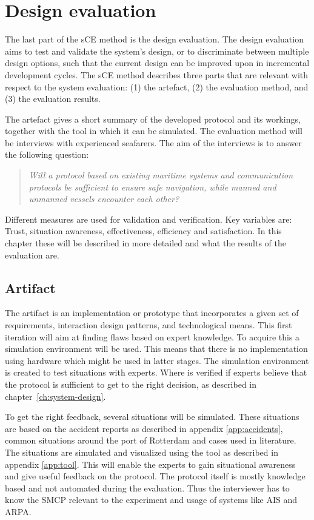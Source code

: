 \chapter{Design evaluation}
The last part of the sCE method is the design evaluation. The design evaluation aims to test and validate the system’s design, or to discriminate between multiple design options, such that the current design can be improved upon in incremental development cycles. The sCE method describes three parts that are relevant with respect to the system evaluation: (1) the artefact, (2) the evaluation method, and (3) the evaluation results.

The artefact gives a short summary of the developed protocol and its workings, together with the tool in which it can be simulated. The evaluation method will be interviews with experienced seafarers. The aim of the interviews is to answer the following question:
\begin{quotation}
	\emph{Will a protocol based on existing maritime systems and communication protocols be sufficient to ensure safe navigation, while manned and unmanned vessels encounter each other?}
\end{quotation}
Different measures are used for validation and verification. Key variables are: Trust, situation awareness, effectiveness, efficiency and satisfaction. In this chapter these will be described in more detailed and what the results of the evaluation are.

\section{Artifact}
The artifact is an implementation or prototype that incorporates a given set of requirements, interaction design patterns, and technological means. This first iteration will aim at finding flaws based on expert knowledge. To acquire this a simulation environment will be used. This means that there is no implementation using hardware which might be used in latter stages. The simulation environment is created to test situations with experts. Where is verified if experts believe that the protocol is sufficient to get to the right decision, as described in chapter~\ref{ch:system-design}. 

To get the right feedback, several situations will be simulated. These situations are based on the accident reports as described in appendix \ref{app:accidents}, common situations around the port of Rotterdam and cases used in literature. The situations are simulated and visualized using the tool as described in appendix \ref{app:tool}. This will enable the experts to gain situational awareness and give useful feedback on the protocol. The protocol itself is mostly knowledge based and not automated during the evaluation. Thus the interviewer has to know the \acf{SMCP} relevant to the experiment and usage of systems like \acf{AIS} and \acf{ARPA}.

